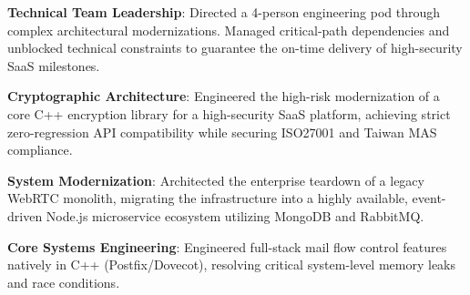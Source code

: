 \begin{resumeitems}
\item \textbf{Technical Team Leadership}: Directed a 4-person engineering pod through complex architectural modernizations. Managed critical-path dependencies and unblocked technical constraints to guarantee the on-time delivery of high-security SaaS milestones.
\item \textbf{Cryptographic Architecture}: Engineered the high-risk modernization of a core C++ encryption library for a high-security SaaS platform, achieving strict zero-regression API compatibility while securing ISO27001 and Taiwan MAS compliance.
\item \textbf{System Modernization}: Architected the enterprise teardown of a legacy WebRTC monolith, migrating the infrastructure into a highly available, event-driven Node.js microservice ecosystem utilizing MongoDB and RabbitMQ.
\end{resumeitems}

\begin{resumeitems}
\item \textbf{Core Systems Engineering}: Engineered full-stack mail flow control features natively in C++ (Postfix/Dovecot), resolving critical system-level memory leaks and race conditions.
\end{resumeitems}
